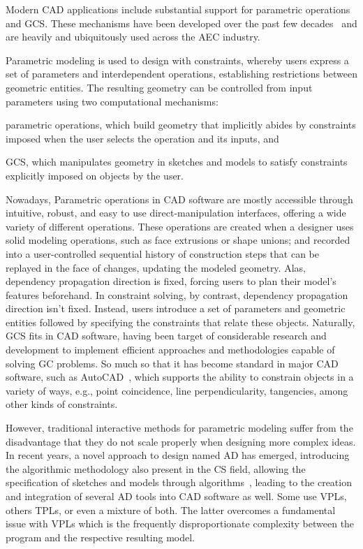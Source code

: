 %
\label{chap:intro}
\cleardoublepage{}

\noindent
Modern \ac{CAD} applications include substantial support for parametric
operations and \ac{GCS}.  These mechanisms have been developed over the past few
decades~\cite{Bettig:2011:GCSPC} and are heavily and ubiquitously used across
the \ac{AEC} industry.

Parametric modeling is used to design with constraints, whereby users express a
set of parameters and interdependent operations, establishing restrictions
between geometric entities.  The resulting geometry can be controlled from input
parameters using two computational mechanisms:
\begin{enumerate*}[label= (\arabic*)]
  \item parametric operations, which build geometry that implicitly abides by
  constraints imposed when the user selects the operation and its inputs, and
  \item \ac{GCS}, which manipulates geometry in sketches and models to satisfy
  constraints explicitly imposed on objects by the user.
\end{enumerate*}

Nowadays, Parametric operations in \ac{CAD} software are mostly accessible
through intuitive, robust, and easy to use direct-manipulation interfaces,
offering a wide variety of different operations.  These operations are created
when a designer uses solid modeling operations, such as face extrusions or shape
unions; and recorded into a user-controlled sequential history of construction
steps that can be replayed in the face of changes, updating the modeled
geometry.  Alas, dependency propagation direction is fixed, forcing users to
plan their model's features beforehand.  In constraint solving, by contrast,
dependency propagation direction isn't fixed.  Instead, users introduce a set of
parameters and geometric entities followed by specifying the constraints that
relate these objects.  Naturally, \ac{GCS} fits in \ac{CAD} software, having
been target of considerable research and development to implement efficient
approaches and methodologies capable of solving \ac{GC} problems.  So much so
that it has become standard in major \ac{CAD} software, such as
AutoCAD~\cite{Autodesk:1982:AutoCAD}, which supports the ability to constrain
objects in a variety of ways, e.g., point coincidence, line perpendicularity,
tangencies, among other kinds of constraints.

However, traditional interactive methods for parametric modeling suffer from the
disadvantage that they do not scale properly when designing more complex ideas.
In recent years, a novel approach to design named \ac{AD} has emerged,
introducing the algorithmic methodology also present in the \ac{CS} field,
allowing the specification of sketches and models through
algorithms~\cite{McCormack:2004:GDPDR}, leading to the creation and integration
of several \ac{AD} tools into \ac{CAD} software as well.  Some use \acp{VPL},
others \acp{TPL}, or even a mixture of both.  The latter overcomes a fundamental
issue with \acp{VPL} which is the frequently disproportionate complexity between
the program and the respective resulting model.


